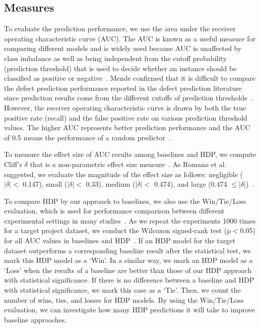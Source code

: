 \subsection{Measures}
\label{sec:measure}
To evaluate the prediction performance, we use the area under the receiver
operating characteristic curve (AUC). The AUC is known as a useful measure for comparing
different models and is widely used because AUC is unaffected by class imbalance
as well as being independent from the cutoff probability (prediction
threshold) that is used to decide whether an instance should be classified as
positive or negative~\cite{Giger12,Lessmann08,Rahman12,Song11}.
Mende confirmed that it is difficult to compare the defect prediction
performance reported in the defect prediction literature since prediction
results come from the different cutoffs of prediction thresholds~\cite{Mende10}.
However, the receiver operating characteristic curve is drawn by both the true
positive rate (recall) and the false positive rate on  various prediction
threshold values.
The higher AUC represents better prediction performance and the AUC of 0.5 means
the performance of a random predictor~\cite{Rahman12}.

To measure the effect size of AUC results among baselines and HDP, we compute Cliff's $\delta$ that is a non-parametric effect size measure~\cite{romano06}. As Romano et al. suggested, we evaluate the magnitude of the effect size as follows: negligible ($|\delta|<$ 0.147), small ($|\delta|<$ 0.33), medium ($|\delta|<$ 0.474), and large (0.474 $\leq|\delta|$)~\cite{romano06}.

To compare HDP by our approach to baselines, we also use the
Win/Tie/Loss evaluation, which is used for performance comparison between
different experimental settings in many studies~\cite{Kocaguneli13,Li12,
Valentini03}. As we repeat the experiments 1000 times for a target project
dataset, we
conduct the Wilcoxon signed-rank test (p$<$0.05) for all AUC values in
baselines and HDP~\cite{Wilcoxon45}.
If an HDP model for the target dataset outperforms a corresponding
baseline result after the statistical test, we mark this HDP model as a `Win'.
In a similar way, we mark an HDP model as a `Loss' when the results of
a baseline are better than those of our HDP approach with statistical
significance.
If there is no difference between a baseline and HDP with statistical
significance, we mark this case as a `Tie'. Then, we count the number of
wins, ties, and losses for HDP models. By using the Win/Tie/Loss
evaluation, we can investigate how many HDP predictions it will take to improve
baseline approaches.


